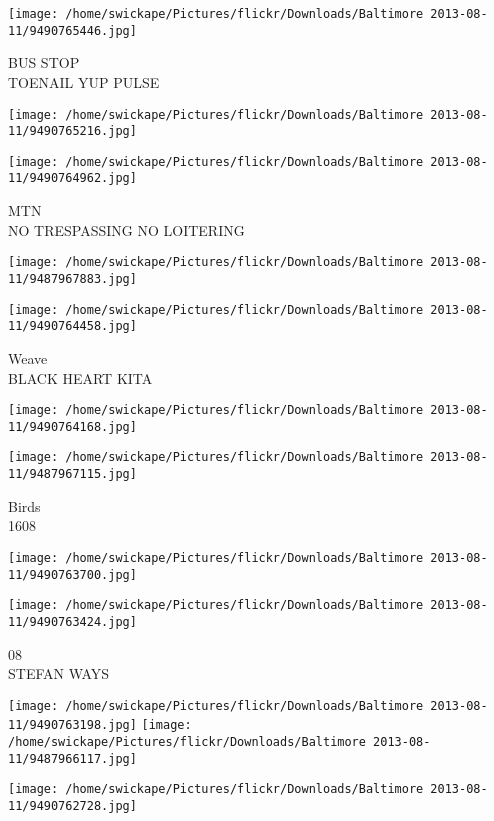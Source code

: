 \documentclass[10pt,letterpaper]{article}
\begin{document}
\vspace{0.25in}
\texttt{[image: /home/swickape/Pictures/flickr/Downloads/Baltimore 2013-08-11/9490765446.jpg]}

BUS STOP\\
TOENAIL YUP PULSE
\pagebreak

\texttt{[image: /home/swickape/Pictures/flickr/Downloads/Baltimore 2013-08-11/9490765216.jpg]}

\vspace{0.25in}
\texttt{[image: /home/swickape/Pictures/flickr/Downloads/Baltimore 2013-08-11/9490764962.jpg]}

MTN\\
NO TRESPASSING NO LOITERING
\pagebreak

\texttt{[image: /home/swickape/Pictures/flickr/Downloads/Baltimore 2013-08-11/9487967883.jpg]}

\vspace{0.25in}
\texttt{[image: /home/swickape/Pictures/flickr/Downloads/Baltimore 2013-08-11/9490764458.jpg]}

Weave\\
BLACK HEART KITA
\pagebreak

\texttt{[image: /home/swickape/Pictures/flickr/Downloads/Baltimore 2013-08-11/9490764168.jpg]}

\vspace{0.25in}
\texttt{[image: /home/swickape/Pictures/flickr/Downloads/Baltimore 2013-08-11/9487967115.jpg]}

Birds\\
1608
\pagebreak

\texttt{[image: /home/swickape/Pictures/flickr/Downloads/Baltimore 2013-08-11/9490763700.jpg]}

\vspace{0.25in}
\texttt{[image: /home/swickape/Pictures/flickr/Downloads/Baltimore 2013-08-11/9490763424.jpg]}

08\\
STEFAN WAYS
\pagebreak

\texttt{[image: /home/swickape/Pictures/flickr/Downloads/Baltimore 2013-08-11/9490763198.jpg]}
\texttt{[image: /home/swickape/Pictures/flickr/Downloads/Baltimore 2013-08-11/9487966117.jpg]}

\vspace{0.25in}
\texttt{[image: /home/swickape/Pictures/flickr/Downloads/Baltimore 2013-08-11/9490762728.jpg]}
\end{document}
